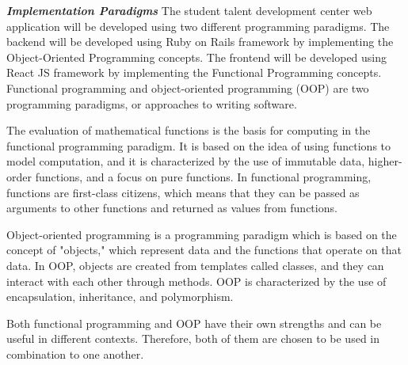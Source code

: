 \begin{justify}
\newendline \textbf{\textit{Implementation Paradigms}}\newendline
The student talent development center web application will be developed using two different programming paradigms. The backend will be developed using Ruby on Rails framework by implementing the Object-Oriented Programming concepts. The frontend will be developed using React JS framework by implementing the Functional Programming concepts. Functional programming and object-oriented programming (OOP) are two programming paradigms, or approaches to writing software.

\vspace{0.25cm}
\newendline The evaluation of mathematical functions is the basis for computing in the functional programming paradigm. It is based on the idea of using functions to model computation, and it is characterized by the use of immutable data, higher-order functions, and a focus on pure functions. In functional programming, functions are first-class citizens, which means that they can be passed as arguments to other functions and returned as values from functions.

\vspace{0.25cm}
\newendline Object-oriented programming is a programming paradigm which is based on the concept of "objects," which represent data and the functions that operate on that data. In OOP, objects are created from templates called classes, and they can interact with each other through methods. OOP is characterized by the use of encapsulation, inheritance, and polymorphism.

\vspace{0.25cm}
\newendline Both functional programming and OOP have their own strengths and can be useful in different contexts. Therefore, both of them are chosen to be used in combination to one another.
\end{justify}
\clearpage
